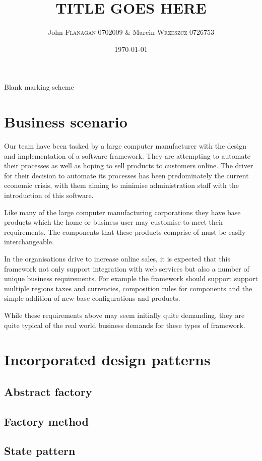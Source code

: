 \documentclass[pdftex,11pt,a4paper]{article}
\author{John \textsc{Flanagan} 0702009 \& Marcin \textsc{Wrzeszcz} 0726753 }
\title{TITLE GOES HERE}
\date{\today}
\begin{document}


\begin{center}
	Blank marking scheme
\end{center}

\pagebreak

\tableofcontents
\pagebreak

\section{Business scenario}
Our team have been tasked by a large computer manufacturer with the design and implementation of a software framework. They are attempting to automate their processes as well as hoping to sell products to customers online. The driver for their decision to automate  its processes has been predominately the current economic crisis, with them aiming to minimise administration staff with the introduction of this software. 

Like many of the large computer manufacturing corporations they have base products which the home or business user may customise to meet their requirements. The components that these products comprise of must be easily interchangeable. 

In the organisations drive to increase online sales, it is expected that this framework not only support integration with web services but also a number of unique business requirements. For example the framework should support support multiple regions taxes and currencies, composition rules for components and the simple addition of new base configurations and products.

While these requirements above may seem initially quite demanding, they are quite typical of the real world business demands for these types of framework.

\pagebreak
\section{Incorporated design patterns}
\subsection{Abstract factory}
\subsection{Factory method}
\subsection{State pattern}
\end{document}
